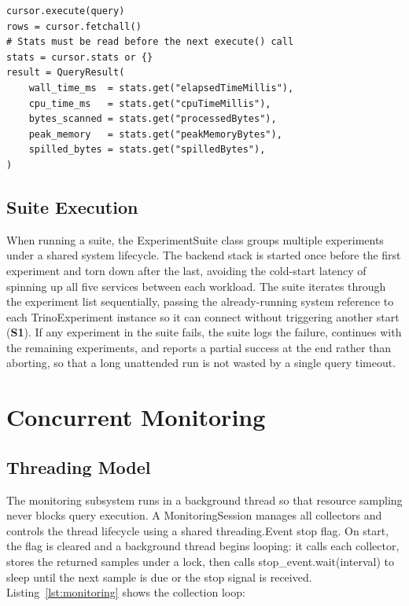 \documentclass{l4proj}
\begin{document}
\begin{lstlisting}[style=pythonstyle, caption={Extracting Trino engine statistics from the cursor immediately after fetchall.}, label={lst:stats}]
cursor.execute(query)
rows = cursor.fetchall()
# Stats must be read before the next execute() call
stats = cursor.stats or {}
result = QueryResult(
    wall_time_ms  = stats.get("elapsedTimeMillis"),
    cpu_time_ms   = stats.get("cpuTimeMillis"),
    bytes_scanned = stats.get("processedBytes"),
    peak_memory   = stats.get("peakMemoryBytes"),
    spilled_bytes = stats.get("spilledBytes"),
)
\end{lstlisting}

\subsection{Suite Execution}
\label{sec:impl_suite}

When running a suite, the ExperimentSuite class groups multiple experiments under a shared system lifecycle. The backend stack is started once before the first experiment and torn down after the last, avoiding the cold-start latency of spinning up all five services between each workload. The suite iterates through the experiment list sequentially, passing the already-running system reference to each TrinoExperiment instance so it can connect without triggering another start (\textbf{S1}). If any experiment in the suite fails, the suite logs the failure, continues with the remaining experiments, and reports a partial success at the end rather than aborting, so that a long unattended run is not wasted by a single query timeout.

\section{Concurrent Monitoring}
\label{sec:impl_monitoring}

\subsection{Threading Model}
\label{sec:impl_threading}

The monitoring subsystem runs in a background thread so that resource sampling never blocks query execution. A MonitoringSession manages all collectors and controls the thread lifecycle using a shared threading.Event stop flag. On start, the flag is cleared and a background thread begins looping: it calls each collector, stores the returned samples under a lock, then calls stop\_event.wait(interval) to sleep until the next sample is due or the stop signal is received. Listing~\ref{lst:monitoring} shows the collection loop:
\end{document}
